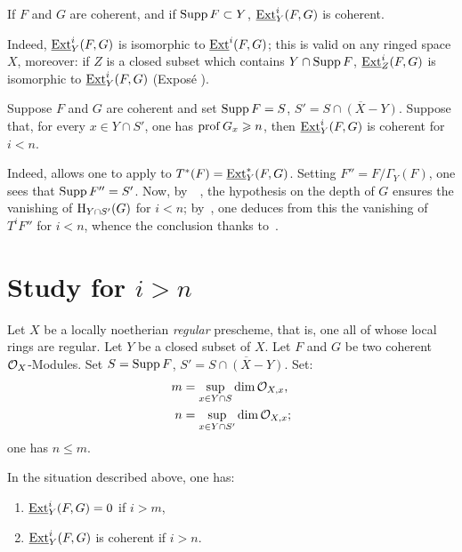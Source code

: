 \begin{lemma}\label{VII.1.6}
If $F$ and $G$ are coherent, and if $\operatorname{Supp} F \subset Y$, $\operatorname{\underline{Ext}}^i_Y (F, G)$ is coherent.
\end{lemma}

Indeed, $\operatorname{\underline{Ext}}^i_Y (F, G)$ is isomorphic to $\operatorname{\underline{Ext}}^i (F, G)$; this is valid on any ringed space $X$, moreover: if $Z$ is a closed subset which contains $Y \cap \operatorname{Supp} F$, $\operatorname{\underline{Ext}}^i_Z (F, G)$ is isomorphic to $\operatorname{\underline{Ext}}^i_Y (F, G)$ (\cf Expos\'e ).

\begin{proposition}\label{VII.1.7}
\hspace*{3mm}Suppose $F$ and $G$ are coherent and set $\operatorname{Supp} F = S$, $S' = \overline{S \cap (X-Y)}$. Suppose that, for every $x \in Y \cap S'$, one has $\operatorname{prof} G_x \geqslant n$, then $\operatorname{\underline{Ext}}^i_Y (F, G)$ is coherent for $i < n$.
\end{proposition}

Indeed,  allows one to apply  to $T^{\ast}(F) = \operatorname{\underline{Ext}}^{\ast}_Y (F, G)$. Setting $F'' = F/ \Gamma_Y (F)$, one sees that $\operatorname{Supp} F'' = S'$. Now, by~~, the hypothesis on the depth of $G$ ensures the vanishing of $\operatorname{H}_{Y\cap S'}(G)$ for $i<n$; by~, one deduces from this the vanishing of $T^i F''$ for $i < n$, whence the conclusion thanks to~.

\section{Study for $i>n$}\label{VII.2}

Let $X$ be a locally noetherian \emph{regular} prescheme, that is, one all of whose local rings are regular. Let $Y$ be a closed subset of $X$. Let $F$ and $G$ be two coherent $\mathcal{O}_X$-Modules. Set $S = \operatorname{Supp} F$, $S' = \overline{S \cap (X - Y)}$. Set:
\begin{align*}
m& = \sup_{x \in Y \cap S} \dim {\mathcal O}_{X, x},\\
n &= \sup_{x \in Y \cap S'} \dim {\mathcal O}_{X, x};
\end{align*}
one has $n \leq m$.

\begin{proposition}\label{VII.2.1}
In the situation described above, one has:
\begin{enumerate}
\item
$\operatorname{\underline{Ext}}^i_Y (F, G) = 0$ if $i > m$,

\item
$\operatorname{\underline{Ext}}^i_Y (F, G)$ is coherent if $i > n$.
\end{enumerate}
\end{proposition}

